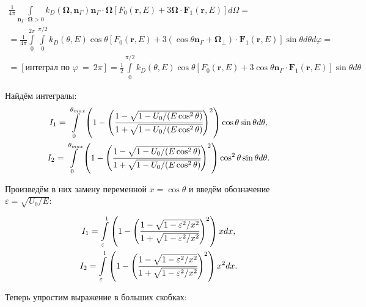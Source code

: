 \documentclass[a4paper,12pt]{article} %
\renewcommand{\vec}[1]{\bm{#1}}
\newcommand{\eps}{\varepsilon}
\renewcommand{\phi}{\varphi}
\begin{document}
\begin{equation}
\begin{gathered}
    \frac{1}{4\pi} \int\limits_{\vec{n}_\Gamma \cdot \vec{\Omega}>0} k_D(\vec{\Omega}, \vec{n}_\Gamma) \vec{n}_\Gamma \cdot \vec{\Omega} [F_0(\vec{r}, E) + 3\vec{\Omega}\cdot\vec{F}_1(\vec{r}, E)]d\Omega = \\
    =
    \frac{1}{4\pi}
    \int\limits_{0}^{2\pi}
    \int\limits_{0}^{\pi/2}
     k_D(\theta, E) \cos \theta [F_0(\vec{r}, E) + 3(\cos \theta \vec{n}_\Gamma + \vec{\Omega}_\perp)\cdot \vec{F}_1(\vec{r}, E)]
     \sin \theta d\theta d\phi = \\
     =
     [\text{интеграл по }\phi~=~2\pi] =
     \frac{1}{2}
     \int\limits_{0}^{\pi/2}
     k_D(\theta, E) \cos \theta [F_0(\vec{r}, E) + 3 \cos \theta \vec{n}_\Gamma \cdot \vec{F}_1(\vec{r}, E)]
     \sin \theta d\theta
\end{gathered}
\end{equation}

Найдём интегралы:
\begin{equation}
\begin{gathered}
    I_1 =
    \int\limits_{0}^{\theta_{max}}
    \left(1 - \Bigg(\cfrac{1 - \sqrt{1 - U_0/(E  \cos^2 \theta)}}{1 + \sqrt{1 -
    U_0/(E  \cos^2 \theta)}}\Bigg)^2\right) \cos \theta \sin \theta d\theta,\\
    I_2 =
    \int\limits_{0}^{\theta_{max}}
    \left(1 - \Bigg(\cfrac{1 - \sqrt{1 - U_0/(E  \cos^2 \theta)}}{1 + \sqrt{1 -
    U_0/(E  \cos^2 \theta)}}\Bigg)^2\right) \cos^2 \theta \sin \theta d\theta.
\end{gathered}
\end{equation}

Произведём в них замену переменной \( x=\cos\theta \) и введём обозначение
\( \eps = \sqrt{U_0/E} \):

\begin{equation}
\begin{gathered}
    I_1 =
    \int\limits_{\eps}^{1}
    \left(1 - \Bigg(\cfrac{1 - \sqrt{1 - \eps^2/x^2}}{1 + \sqrt{1 -
    \eps^2 / x^2}}\Bigg)^2\right) x dx,\\
    I_2 =
    \int\limits_{\eps}^{1}
    \left(1 - \Bigg(\cfrac{1 - \sqrt{1 - \eps^2/x^2}}{1 + \sqrt{1 -
    \eps^2 / x^2}}\Bigg)^2\right) x^2 dx.\\
\end{gathered}
\end{equation}

Теперь упростим выражение в больших скобках:
\end{document}
